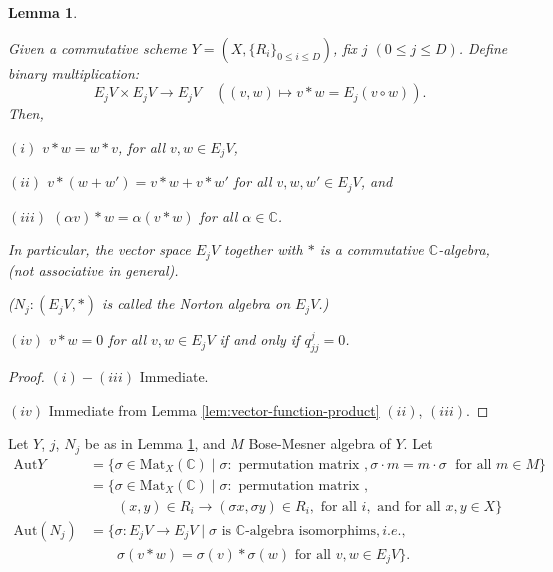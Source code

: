 \documentclass[
]{book}
\newtheorem{lemma}{Lemma}[chapter]
\theoremstyle{definition}
\theoremstyle{definition}
\theoremstyle{definition}
\theoremstyle{definition}
\theoremstyle{remark}
\begin{document}
\begin{lemma}
\protect\hypertarget{lem:norton-algebra}{}\label{lem:norton-algebra}

Given a commutative scheme \(Y = (X, \{R_i\}_{0\leq i\leq D})\), fix \(j\) \((0\leq j\leq D)\).
Define binary multiplication:
\[E_jV \times E_jV \longrightarrow E_jV \quad ((v,w) \mapsto v\ast w = E_j(v\circ w)).\]
Then,

\((i)\) \(v\ast w = w\ast v\), for all \(v,w\in E_jV\),

\((ii)\) \(v\ast (w + w') = v\ast w + v\ast w'\) for all \(v,w,w'\in E_jV\), and

\((iii)\) \((\alpha v)\ast w = \alpha(v\ast w)\) for all \(\alpha \in \mathbb{C}\).

In particular, the vector space \(E_jV\) together with \(\ast\) is a commutative \(\mathbb{C}\)-algebra, (not associative in general).

(\(N_j: (E_jV, \ast)\) is called the Norton algebra  on \(E_jV\).)

\((iv)\) \(v\ast w = 0\) for all \(v, w\in E_jV\) if and only if \(q^j_{jj} = 0\).

\end{lemma}

\begin{proof}
\leavevmode

\((i)-(iii)\) Immediate.

\((iv)\) Immediate from Lemma \ref{lem:vector-function-product} \((ii)\), \((iii)\).

\end{proof}

Let \(Y\), \(j\), \(N_j\) be as in Lemma \ref{lem:norton-algebra}, and \(M\) Bose-Mesner algebra of \(Y\).
Let
\begin{align}
\mathrm{Aut}Y & = \{\sigma\in \mathrm{Mat}_X(\mathbb{C}) \mid \sigma: \text{ permutation matrix }, \sigma \cdot m = m\cdot \sigma \;\text{ for all }m\in M\}\\
& = \{\sigma\in \mathrm{Mat}_X(\mathbb{C}) \mid \sigma: \text{ permutation matrix },\\
& \qquad (x,y)\in R_i \to (\sigma x, \sigma y)\in R_i, \text{ for all } i, \text{ and for all } x,y\in X\}\\
\mathrm{Aut}(N_j) & = \{\sigma: E_jV \to E_jV \mid \sigma \text{ is $\mathbb{C}$-algebra isomorphims},i.e.,\\
& \qquad \sigma(v\ast w) = \sigma(v)\ast\sigma(w) \text{ for all }v, w\in E_jV\}.
\end{align}
\end{document}
